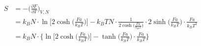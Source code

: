     \begin{align}
        S
        &=-\bigg(\frac{\partial F}{\partial T}\bigg)_{V,N} \\
        &=k_BN\cdot\ln\bigg[2\cosh\bigg(\frac{Fa}{k_BT}\bigg)\bigg]
        -k_BTN\cdot\frac{1}{2\cosh\bigg(\frac{Fa}{k_BT}\bigg)}\cdot
        2\sinh\bigg(\frac{Fa}{k_BT}\bigg)\cdot\frac{Fa}{k_BT^2} \\
        &=k_BN\cdot\bigg\{\ln\bigg[2\cosh\bigg(\frac{Fa}{k_BT}\bigg)\bigg]
        -\tanh\bigg(\frac{Fa}{k_BT}\bigg)\cdot\frac{Fa}{k_BT}\bigg\} \\
    \end{align}

